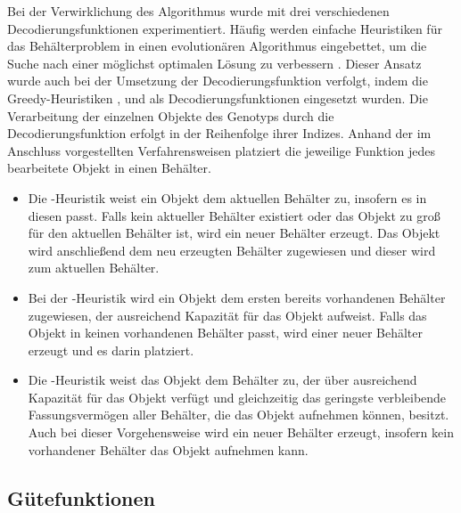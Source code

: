     Bei der Verwirklichung des Algorithmus wurde mit drei verschiedenen Decodierungsfunktionen experimentiert. Häufig werden einfache Heuristiken für das Behälterproblem in einen evolutionären Algorithmus eingebettet, um die Suche nach einer möglichst optimalen Lösung zu verbessern \parencite[64]{MitsuCheng:1999}. Dieser Ansatz wurde auch bei der Umsetzung der Decodierungsfunktion verfolgt, indem die Greedy-Heuristiken \nextfit, \firstfit und \bestfit als Decodierungsfunktionen eingesetzt wurden. Die Verarbeitung der einzelnen Objekte des Genotyps durch die Decodierungsfunktion erfolgt in der Reihenfolge ihrer Indizes. Anhand der im Anschluss vorgestellten Verfahrensweisen platziert die jeweilige Funktion jedes bearbeitete Objekt in einen Behälter.
    \begin{itemize}
    \item Die \textbf{\nextfit}-Heuristik weist ein Objekt dem aktuellen Behälter zu, insofern es in diesen passt. Falls kein aktueller Behälter existiert oder das Objekt zu groß für den aktuellen Behälter ist, wird ein neuer Behälter erzeugt. Das Objekt wird anschließend dem neu erzeugten Behälter zugewiesen und dieser wird zum aktuellen Behälter. 
    \item Bei der \textbf{\firstfit}-Heuristik wird ein Objekt dem ersten bereits vorhandenen Behälter zugewiesen, der ausreichend Kapazität für das Objekt aufweist. Falls das Objekt in keinen vorhandenen Behälter passt, wird einer neuer Behälter erzeugt und es darin platziert.
    \item Die \textbf{\bestfit}-Heuristik weist das Objekt dem Behälter zu, der über ausreichend Kapazität für das Objekt verfügt und gleichzeitig das geringste verbleibende Fassungsvermögen aller Behälter, die das Objekt aufnehmen können, besitzt. Auch bei dieser Vorgehensweise wird ein neuer Behälter erzeugt, insofern kein vorhandener Behälter das Objekt aufnehmen kann. 
    \end{itemize}

\subsection{Gütefunktionen}


